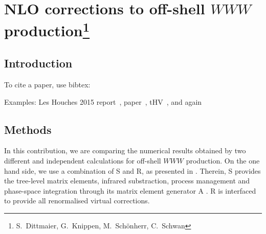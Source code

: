 \newcommand{\Herwig}{H\protect\scalebox{0.8}{ERWIG}\xspace}
\newcommand{\Pythia}{P\protect\scalebox{0.8}{YTHIA}\xspace}
\newcommand{\Sherpa}{S\protect\scalebox{0.8}{HERPA}\xspace}
\newcommand{\Rivet}{R\protect\scalebox{0.8}{IVET}\xspace}
\newcommand{\Recola}{R\protect\scalebox{0.8}{ECOLA}\xspace}
\newcommand{\Amegic}{A\protect\scalebox{0.8}{MEGIC}\xspace}
\newcommand{\Professor}{P\protect\scalebox{0.8}{ROFESSOR}\xspace}
\newcommand{\OpenLoops}{O\protect\scalebox{0.8}{PENLOOPS 2}\xspace}
\newcommand{\Collier}{C\protect\scalebox{0.8}{OLLIER}\xspace}
\newcommand{\Madgraph}{M\protect\scalebox{0.8}{G5\_aMC@NLO}\xspace}
\newcommand{\eps}{\varepsilon}
\newcommand{\mc}[1]{\mathcal{#1}}
\newcommand{\mr}[1]{\mathrm{#1}}
\newcommand{\mb}[1]{\mathbb{#1}}
\newcommand{\tm}[1]{\scalebox{0.95}{$#1$}}
\newcommand{\vp}{\ensuremath{\vphantom{\int_a^b}}}
\newcommand{\vP}{\ensuremath{\vphantom{\int\limits_a^b}}}

\section{NLO corrections to off-shell $WWW$ production\protect\footnote{
  S.~Dittmaier,
  G.~Knippen,
  M.~Sch{\"o}nherr,
  C.~Schwan}{}}

\label{sec:WWW}


\subsection{Introduction}
\label{sec:WWW:intro}

To cite a paper, use bibtex:

Examples: Les Houches 2015 report~\cite{Badger:2016bpw},
paper~\cite{Aaboud:2016ffv}, tHV~\cite{'tHooft:1972fi}, and again~\cite{'tHooft:1972fi}


\subsection{Methods}
\label{sec:WWW:methods}

In this contribution, we are comparing the numerical results 
obtained by two different and independent calculations for 
off-shell $WWW$ production.
On the one hand side, we use a combination of \Sherpa \cite{} 
and \Recola \cite{Actis:2012qn,Actis:2016mpe}, as presented in \cite{}.
Therein, \Sherpa provides the tree-level matrix elements, 
infrared substraction, process management and phase-space 
integration through its matrix element generator \Amegic 
\cite{}. 
\Recola is interfaced \cite{} to provide all renormalised 
virtual corrections.

